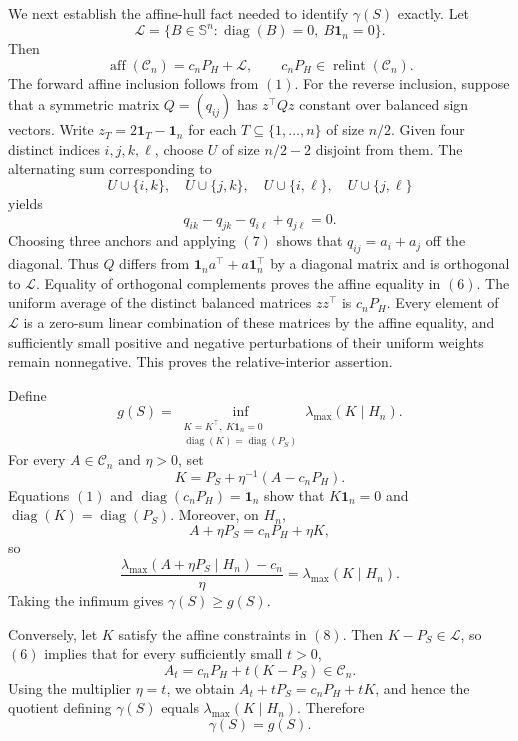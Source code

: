 We next establish the affine-hull fact needed to identify \(\gamma(S)\) exactly. Let
\[
\mathcal L=\{B\in\mathbb S^n:\operatorname{diag}(B)=0,\ B\mathbf1_n=0\}.
\]
Then
\[
\operatorname{aff}(\mathcal C_n)=c_nP_H+\mathcal L,
\qquad
c_nP_H\in\operatorname{relint}(\mathcal C_n).
\tag{6}
\]
The forward affine inclusion follows from \((1)\). For the reverse inclusion, suppose that a symmetric matrix \(Q=(q_{ij})\) has \(z^\top Qz\) constant over balanced sign vectors. Write \(z_T=2\mathbf1_T-\mathbf1_n\) for each \(T\subseteq\{1,\ldots,n\}\) of size \(n/2\). Given four distinct indices \(i,j,k,\ell\), choose \(U\) of size \(n/2-2\) disjoint from them. The alternating sum corresponding to
\[
U\cup\{i,k\},\quad U\cup\{j,k\},\quad
U\cup\{i,\ell\},\quad U\cup\{j,\ell\}
\]
yields
\[
q_{ik}-q_{jk}-q_{i\ell}+q_{j\ell}=0.
\tag{7}
\]
Choosing three anchors and applying \((7)\) shows that \(q_{ij}=a_i+a_j\) off the diagonal. Thus \(Q\) differs from \(\mathbf1_na^\top+a\mathbf1_n^\top\) by a diagonal matrix and is orthogonal to \(\mathcal L\). Equality of orthogonal complements proves the affine equality in \((6)\). The uniform average of the distinct balanced matrices \(zz^\top\) is \(c_nP_H\). Every element of \(\mathcal L\) is a zero-sum linear combination of these matrices by the affine equality, and sufficiently small positive and negative perturbations of their uniform weights remain nonnegative. This proves the relative-interior assertion.

Define
\[
g(S)=\inf_{\substack{K=K^\top,\ K\mathbf1_n=0\\
\operatorname{diag}(K)=\operatorname{diag}(P_S)}}
\lambda_{\max}(K\mid H_n).
\tag{8}
\]
For every \(A\in\mathcal C_n\) and \(\eta>0\), set
\[
K=P_S+\eta^{-1}(A-c_nP_H).
\tag{9}
\]
Equations \((1)\) and \(\operatorname{diag}(c_nP_H)=\mathbf1_n\) show that \(K\mathbf1_n=0\) and \(\operatorname{diag}(K)=\operatorname{diag}(P_S)\). Moreover, on \(H_n\),
\[
A+\eta P_S=c_nP_H+\eta K,
\]
so
\[
\frac{\lambda_{\max}(A+\eta P_S\mid H_n)-c_n}{\eta}
=\lambda_{\max}(K\mid H_n).
\tag{10}
\]
Taking the infimum gives \(\gamma(S)\geq g(S)\).

Conversely, let \(K\) satisfy the affine constraints in \((8)\). Then \(K-P_S\in\mathcal L\), so \((6)\) implies that for every sufficiently small \(t>0\),
\[
A_t=c_nP_H+t(K-P_S)\in\mathcal C_n.
\tag{11}
\]
Using the multiplier \(\eta=t\), we obtain \(A_t+tP_S=c_nP_H+tK\), and hence the quotient defining \(\gamma(S)\) equals \(\lambda_{\max}(K\mid H_n)\). Therefore
\[
\gamma(S)=g(S).
\tag{12}
\]


